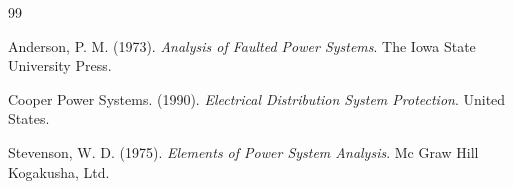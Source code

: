 \documentclass[12pt,a4paper,oneside]{book}
\begin{document}







\begin{thebibliography}{99}

 Anderson, P. M. (1973). \textit{Analysis of Faulted Power Systems}. The Iowa State University Press.

 Cooper Power Systems. (1990). \textit{Electrical Distribution System Protection}. United States.

 Stevenson, W. D. (1975). \textit{Elements of Power System Analysis}. Mc Graw Hill Kogakusha, Ltd.

\end{thebibliography}

\appendix

\end{document}

